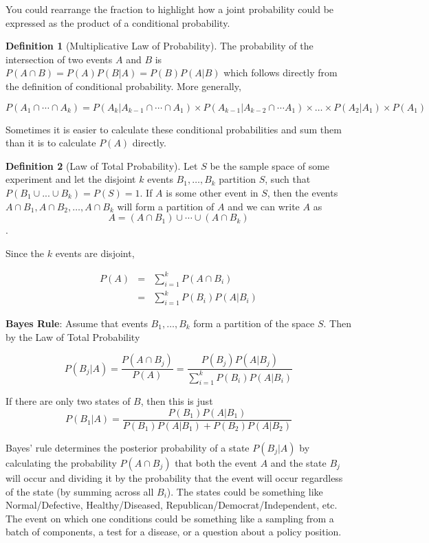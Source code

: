 \documentclass[
]{book}
\theoremstyle{definition}
\newtheorem{definition}{Definition}[chapter]
\theoremstyle{definition}
\theoremstyle{definition}
\theoremstyle{definition}
\theoremstyle{remark}
\begin{document}
You could rearrange the fraction to highlight how a joint probability could be expressed as the product of a conditional probability.

\begin{definition}[Multiplicative Law of Probability]
\protect\hypertarget{def:unnamed-chunk-255}{}{\label{def:unnamed-chunk-255} {} }
The probability of the intersection of two events \(A\) and \(B\) is \(P(A\cap B)=P(A)P(B|A)=P(B)P(A|B)\) which follows directly from the definition of conditional probability. More generally,

\[P(A_1\cap \cdots\cap A_k) = P(A_k| A_{k-1}\cap \cdots \cap A_1)\times P(A_{k-1}|A_{k-2}\cap \cdots A_1) \times \ldots \times P(A_2|A_1)\times P(A_1)\]

Sometimes it is easier to calculate these conditional probabilities and sum them than it is to calculate \(P(A)\) directly.
\end{definition}

\begin{definition}[Law of Total Probability]
\protect\hypertarget{def:unnamed-chunk-256}{}{\label{def:unnamed-chunk-256} {} }Let \(S\) be the sample space of some experiment and let the disjoint \(k\) events \(B_1,\ldots,B_k\) partition \(S\), such that \(P(B_1\cup ... \cup B_k) = P(S) = 1\). If \(A\) is some other event in \(S\), then the events \(A\cap B_1, A\cap B_2, \ldots, A\cap B_k\) will form a partition of \(A\) and we can write \(A\) as \[A=(A\cap B_1)\cup\cdots\cup (A\cap B_k)\].

Since the \(k\) events are disjoint,

\begin{eqnarray*}
P(A)&=&\sum\limits_{i=1}^k P(A \cap B_i)\\
      &=&\sum\limits_{i=1}^k P(B_i)P(A|B_i)
\end{eqnarray*}
\end{definition}

\textbf{Bayes Rule}: Assume that events \(B_1,\ldots,B_k\) form a partition of the space \(S\). Then by the Law of Total Probability

\[P(B_j|A)= \frac{P(A \cap B_j)} {P(A)} = \frac{P(B_j) P(A|B_j)}{\sum\limits_{i=1}^k P(B_i)P(A|B_i)}\]

If there are only two states of \(B\), then this is just
\[P(B_1|A)=\frac{P(B_1)P(A|B_1)} {P(B_1)P(A|B_1)+P(B_2)P(A|B_2)}\]

Bayes' rule determines the posterior probability of a state \(P(B_j|A)\) by calculating the probability \(P(A \cap B_j)\) that both the event \(A\) and the state \(B_j\) will occur and dividing it by the probability that the event will occur regardless of the state (by summing across all \(B_i\)). The states could be something like Normal/Defective, Healthy/Diseased, Republican/Democrat/Independent, etc. The event on which one conditions could be something like a sampling from a batch of components, a test for a disease, or a question about a policy position.
\end{document}
